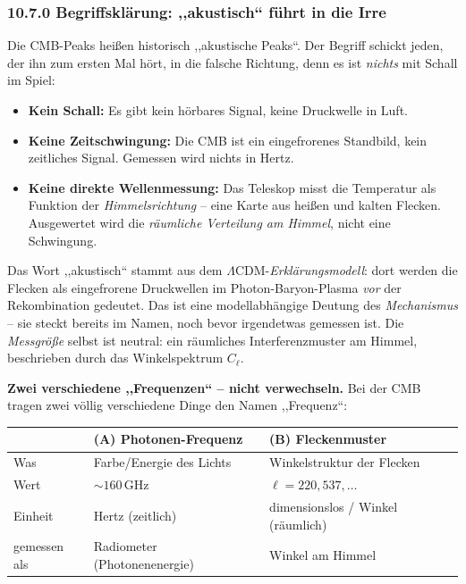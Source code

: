 \subsubsection*{10.7.0 Begriffsklärung: ,,akustisch`` führt in die Irre}

Die CMB-Peaks heißen historisch ,,akustische Peaks``. Der Begriff
schickt jeden, der ihn zum ersten Mal hört, in die falsche Richtung,
denn es ist \emph{nichts} mit Schall im Spiel:

\begin{itemize}
  \item \textbf{Kein Schall:} Es gibt kein hörbares Signal, keine
        Druckwelle in Luft.
  \item \textbf{Keine Zeitschwingung:} Die CMB ist ein eingefrorenes
        Standbild, kein zeitliches Signal. Gemessen wird nichts in Hertz.
  \item \textbf{Keine direkte Wellenmessung:} Das Teleskop misst die
        Temperatur als Funktion der \emph{Himmelsrichtung} -- eine Karte
        aus heißen und kalten Flecken. Ausgewertet wird die
        \emph{räumliche Verteilung am Himmel}, nicht eine Schwingung.
\end{itemize}

Das Wort ,,akustisch`` stammt aus dem $\Lambda$CDM-\emph{Erklärungsmodell}:
dort werden die Flecken als eingefrorene Druckwellen im Photon-Baryon-Plasma
\emph{vor} der Rekombination gedeutet. Das ist eine modellabhängige
Deutung des \emph{Mechanismus} -- sie steckt bereits im Namen, noch bevor
irgendetwas gemessen ist. Die \emph{Messgröße} selbst ist neutral: ein
räumliches Interferenzmuster am Himmel, beschrieben durch das
Winkelspektrum $C_\ell$.

\textbf{Zwei verschiedene ,,Frequenzen`` -- nicht verwechseln.} Bei der
CMB tragen zwei völlig verschiedene Dinge den Namen ,,Frequenz``:

\begin{center}
\begin{tabular}{p{1cm}p{5.3cm}p{5.3cm}}
\toprule
 & \textbf{(A) Photonen-Frequenz} & \textbf{(B) Fleckenmuster} \\
\midrule
Was & Farbe/Energie des Lichts & Winkelstruktur der Flecken \\
Wert & $\sim 160$\,GHz & $\ell = 220, 537, \ldots$ \\
Einheit & Hertz (zeitlich) & dimensionslos / Winkel (räumlich) \\
gemessen als & Radiometer (Photonenenergie) & Winkel am Himmel \\
\bottomrule
\end{tabular}
\end{center}

